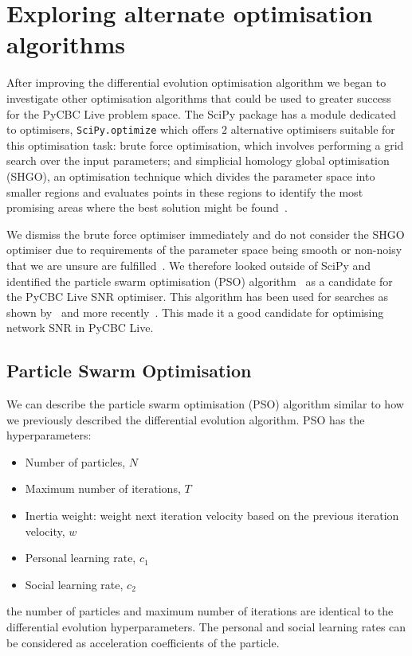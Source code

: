 \section{\label{7:sec:exploring_alt_opts}Exploring alternate optimisation algorithms}

After improving the differential evolution optimisation algorithm we began to investigate other optimisation algorithms that could be used to greater success for the PyCBC Live problem space. The SciPy package has a module dedicated to optimisers, \texttt{SciPy.optimize} which offers $2$ alternative optimisers suitable for this optimisation task: brute force optimisation, which involves performing a grid search over the input parameters; and simplicial homology global optimisation (SHGO), an optimisation technique which divides the parameter space into smaller regions and evaluates points in these regions to identify the most promising areas where the best solution might be found~\cite{shgo:2018}.

We dismiss the brute force optimiser immediately and do not consider the SHGO optimiser due to requirements of the parameter space being smooth or non-noisy that we are unsure are fulfilled~\cite{shgo:2018}. We therefore looked outside of SciPy and identified the particle swarm optimisation (PSO) algorithm~\cite{pso:1995} as a candidate for the PyCBC Live SNR optimiser. This algorithm has been used for \gwadj searches as shown by~\cite{pso_search_1:2018} and more recently~\cite{pso_search_2:2023}. This made it a good candidate for optimising network SNR in PyCBC Live.

\subsection{\label{7:sec:pso}Particle Swarm Optimisation}

We can describe the particle swarm optimisation (PSO) algorithm similar to how we previously described the differential evolution algorithm. PSO has the hyperparameters:
%
\begin{itemize}
    \item Number of particles, $N$
    \item Maximum number of iterations, $T$
    \item Inertia weight: weight next iteration velocity based on the previous iteration velocity, $w$
    \item Personal learning rate, $c_{1}$
    \item Social learning rate, $c_{2}$
\end{itemize}
%
the number of particles and maximum number of iterations are identical to the differential evolution hyperparameters. The personal and social learning rates can be considered as acceleration coefficients of the particle.

